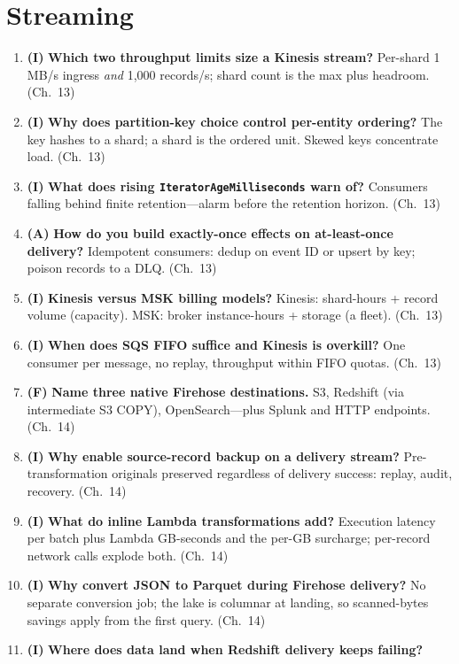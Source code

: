 \section{Streaming}
\begin{enumerate}
    \item \textbf{(I)} \textbf{Which two throughput limits size a Kinesis stream?}
    Per-shard 1 MB/s ingress \emph{and} 1{,}000 records/s; shard count is the max plus headroom.
    (Ch.~13)
    \item \textbf{(I)} \textbf{Why does partition-key choice control per-entity ordering?}
    The key hashes to a shard; a shard is the ordered unit. Skewed keys concentrate load. (Ch.~13)
    \item \textbf{(I)} \textbf{What does rising \texttt{IteratorAgeMilliseconds} warn of?}
    Consumers falling behind finite retention---alarm before the retention horizon. (Ch.~13)
    \item \textbf{(A)} \textbf{How do you build exactly-once effects on at-least-once delivery?}
    Idempotent consumers: dedup on event ID or upsert by key; poison records to a DLQ. (Ch.~13)
    \item \textbf{(I)} \textbf{Kinesis versus MSK billing models?}
    Kinesis: shard-hours + record volume (capacity). MSK: broker instance-hours + storage (a
    fleet). (Ch.~13)
    \item \textbf{(I)} \textbf{When does SQS FIFO suffice and Kinesis is overkill?}
    One consumer per message, no replay, throughput within FIFO quotas. (Ch.~13)
    \item \textbf{(F)} \textbf{Name three native Firehose destinations.}
    S3, Redshift (via intermediate S3 COPY), OpenSearch---plus Splunk and HTTP endpoints. (Ch.~14)
    \item \textbf{(I)} \textbf{Why enable source-record backup on a delivery stream?}
    Pre-transformation originals preserved regardless of delivery success: replay, audit,
    recovery. (Ch.~14)
    \item \textbf{(I)} \textbf{What do inline Lambda transformations add?}
    Execution latency per batch plus Lambda GB-seconds and the per-GB surcharge; per-record network
    calls explode both. (Ch.~14)
    \item \textbf{(I)} \textbf{Why convert JSON to Parquet during Firehose delivery?}
    No separate conversion job; the lake is columnar at landing, so scanned-bytes savings apply
    from the first query. (Ch.~14)
    \item \textbf{(I)} \textbf{Where does data land when Redshift delivery keeps failing?}

\end{enumerate}
